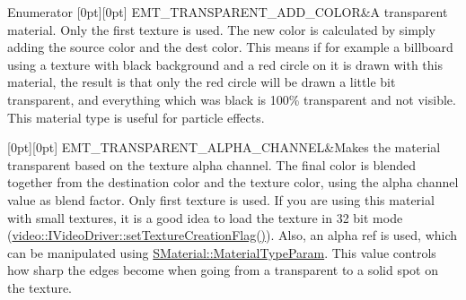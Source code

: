 \begin{DoxyEnumFields}{Enumerator}
[0pt][0pt]{}\mbox{\label{namespaceirr_1_1video_ac8e9b6c66f7cebabd1a6d30cbc5430f1abb269ebd3a090ac2ca875170ab8e6e3b}} 
E\+M\+T\+\_\+\+T\+R\+A\+N\+S\+P\+A\+R\+E\+N\+T\+\_\+\+A\+D\+D\+\_\+\+C\+O\+L\+OR&A transparent material. Only the first texture is used. The new color is calculated by simply adding the source color and the dest color. This means if for example a billboard using a texture with black background and a red circle on it is drawn with this material, the result is that only the red circle will be drawn a little bit transparent, and everything which was black is 100\% transparent and not visible. This material type is useful for particle effects. \\
\hline

[0pt][0pt]{}\mbox{\label{namespaceirr_1_1video_ac8e9b6c66f7cebabd1a6d30cbc5430f1a9b136a4137789140813682f306847ecd}} 
E\+M\+T\+\_\+\+T\+R\+A\+N\+S\+P\+A\+R\+E\+N\+T\+\_\+\+A\+L\+P\+H\+A\+\_\+\+C\+H\+A\+N\+N\+EL&Makes the material transparent based on the texture alpha channel. The final color is blended together from the destination color and the texture color, using the alpha channel value as blend factor. Only first texture is used. If you are using this material with small textures, it is a good idea to load the texture in 32 bit mode (\hyperlink{classirr_1_1video_1_1IVideoDriver_a868b58a6b86b9e4841ca3879ce246c4e}{video\+::\+I\+Video\+Driver\+::set\+Texture\+Creation\+Flag()}). Also, an alpha ref is used, which can be manipulated using \hyperlink{classirr_1_1video_1_1SMaterial_aefe0acce491efa8dedcd2b7cb49f8133}{S\+Material\+::\+Material\+Type\+Param}. This value controls how sharp the edges become when going from a transparent to a solid spot on the texture. \\
\hline


\end{DoxyEnumFields}
